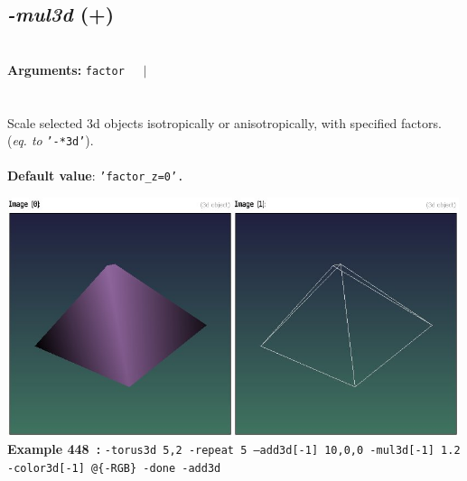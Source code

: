 \documentclass[a4paper,11pt,twoside]{book}
\begin{document}
\subsection{\emph{-mul3d} (+)}\vspace*{-0.5em}
~\\\textbf{Arguments: } 
{\small \texttt{factor}}~~~$|$\\
\\~\\
Scale selected 3d objects isotropically or anisotropically, with specified factors.
~\\(\emph{eq. to} {\small \texttt{'-*3d'}}).
~\\~\\\textbf{Default value}: {\small \texttt{'factor\_z=0'.}}
\begin{center}\includegraphics[keepaspectratio=true,height=7cm,width=\textwidth]{img/gmic_def448.jpg}\\
{\footnotesize \textbf{Example 448~:} \texttt{-torus3d 5,2 -repeat 5 --add3d[-1] 10,0,0 -mul3d[-1] 1.2 -color3d[-1] @\{-RGB\} -done -add3d}}
\end{center}
\end{document}
